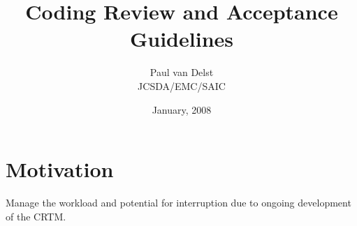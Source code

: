 


\title{Coding Review and Acceptance Guidelines}
\author{Paul van Delst\\JCSDA/EMC/SAIC}
\date{January, 2008}



\maketitle

\draftwatermark
  

\section{Motivation}
Manage the workload and potential for interruption due to ongoing development of the CRTM.  


